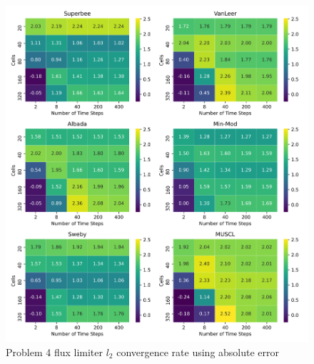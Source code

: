 \begin{figure}[p]
    \centering
    \includegraphics[width=6in]{images/chapter-5/problem4l2FluxLimiterConvergenceRate.png}
    \caption{Problem 4 flux limiter $l_{2}$ convergence rate using absolute error}
    \label{fig:problem4_l2error_fluxlimiter_convergence_rate}
\end{figure}